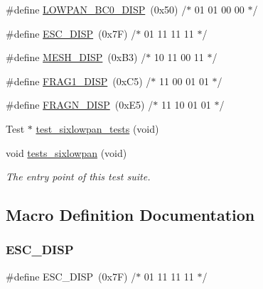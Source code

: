 \begin{DoxyCompactItemize}
\item 
\#define \hyperlink{tests-sixlowpan_8c_ac80b03b970d4cbf0d10ded50fc0043f0}{L\+O\+W\+P\+A\+N\+\_\+\+B\+C0\+\_\+\+D\+I\+SP}~(0x50)  /$\ast$ 01 01 00 00 $\ast$/
\item 
\#define \hyperlink{tests-sixlowpan_8c_ac6df79f06176e32e368d40babcc277e5}{E\+S\+C\+\_\+\+D\+I\+SP}~(0x7\+F)  /$\ast$ 01 11 11 11 $\ast$/
\item 
\#define \hyperlink{tests-sixlowpan_8c_a67c3a2f2936762c978824a3b979c1892}{M\+E\+S\+H\+\_\+\+D\+I\+SP}~(0x\+B3)  /$\ast$ 10 11 00 11 $\ast$/
\item 
\#define \hyperlink{tests-sixlowpan_8c_a0067969da78eae019d8a22cd3f1c3032}{F\+R\+A\+G1\+\_\+\+D\+I\+SP}~(0x\+C5)  /$\ast$ 11 00 01 01 $\ast$/
\item 
\#define \hyperlink{tests-sixlowpan_8c_a151f18b2fc04bbb3e3ef13bd1117e68a}{F\+R\+A\+G\+N\+\_\+\+D\+I\+SP}~(0x\+E5)  /$\ast$ 11 10 01 01 $\ast$/
\item 
Test $\ast$ \hyperlink{tests-sixlowpan_8c_ae33c8feed75ea771e169fe2b2f75fe8c}{test\+\_\+sixlowpan\+\_\+tests} (void)
\item 
void \hyperlink{group__unittests_gab1ea4d232c2abb95e5705f20432f3e07}{tests\+\_\+sixlowpan} (void)
\begin{DoxyCompactList}\small\item\em The entry point of this test suite. \end{DoxyCompactList}\end{DoxyCompactItemize}


\subsection{Macro Definition Documentation}
\mbox{\label{tests-sixlowpan_8c_ac6df79f06176e32e368d40babcc277e5}} 
\subsubsection{\texorpdfstring{E\+S\+C\+\_\+\+D\+I\+SP}{ESC\_DISP}}
{\footnotesize\ttfamily \#define E\+S\+C\+\_\+\+D\+I\+SP~(0x7\+F)  /$\ast$ 01 11 11 11 $\ast$/}

\mbox{\label{tests-sixlowpan_8c_a0067969da78eae019d8a22cd3f1c3032}} 
